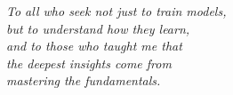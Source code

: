 \documentclass[../main.tex]{subfiles}
\begin{document}
\thispagestyle{empty}
\null\vfill

\begin{center}
{\itshape
To all who seek not just to train models,\\
but to understand how they learn,\\[0.5cm]
and to those who taught me that\\
the deepest insights come from\\
mastering the fundamentals.}
\end{center}

\vfill
\null
\end{document}
